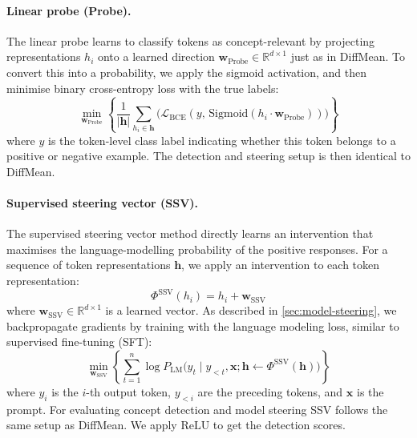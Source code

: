 \documentclass{article}
\theoremstyle{plain}
\theoremstyle{definition}
\theoremstyle{remark}
\newcommand{\methodtag}[2]{%
  \tikz[baseline=(char.base)]{%
    \node[
      fill=#1,
      rounded corners=2pt,
      text=white,
      font=\bfseries,
      minimum width=1em,
      minimum height=1em,
      align=center,
      inner sep=0pt
    ](char){#2};%
  }%
}
\newcommand{\concepttag}{\protect\methodtag{conceptcolor}{C}}
\newcommand{\steeringtag}{\protect\methodtag{steeringcolor}{S}}
\begin{document}
\paragraph{\concepttag{}\steeringtag{} Linear probe (Probe).} The linear probe learns to classify tokens as concept-relevant by projecting representations $h_i$ onto a learned direction $\mathbf{w}_{\text{Probe}} \in \mathbb{R}^{d \times 1}$ just as in DiffMean. To convert this into a probability, we apply the sigmoid activation, and then minimise binary cross-entropy loss with the true labels:
\begin{equation}
\min_{\mathbf{w}_{\text{Probe}}} \left\{ \frac{1}{\lvert \mathbf{h} \rvert}\sum_{h_i \in \mathbf{h}}\bigl(\mathcal{L}_{\text{BCE}}(y, \,\mathrm{Sigmoid}(h_i \cdot \mathbf{w}_{\text{Probe}}))) \right\}
\end{equation}
where $y$ is the token-level class label indicating whether this token belongs to a positive or negative example. The detection and steering setup is then identical to DiffMean.


\paragraph{\concepttag{}\steeringtag{} Supervised steering vector (SSV).} The supervised steering vector method directly learns an intervention that maximises the language-modelling probability of the positive responses. For a sequence of token representations \(\mathbf{h}\), we apply an intervention to each token representation:
\begin{equation}
\Phi^{\text{SSV}}(h_i) = h_i + \mathbf{w}_{\text{SSV}}
\end{equation}
where \(\mathbf{w}_{\text{SSV}} \in \mathbb{R}^{d \times 1}\) is a learned vector. As described in \cref{sec:model-steering}, we backpropagate gradients by training with the language modeling loss, similar to supervised fine-tuning (SFT):
\begin{equation}
\min_{\mathbf{w}_{\text{SSV}}}\left\{\sum_{t=1}^n \log P_{\mathrm{LM}}\bigl(y_t \mid y_{<t}, \mathbf{x}; \mathbf{h} \leftarrow \Phi^{\text{SSV}}(\mathbf{h})\bigr)\right\}
\end{equation}
where \(y_i\) is the \(i\)-th output token, \(y_{<i}\) are the preceding tokens, and \(\mathbf{x}\) is the prompt. For evaluating concept detection and model steering SSV follows the same setup as DiffMean. We apply $\mathrm{ReLU}$ to get the detection scores.
\end{document}
